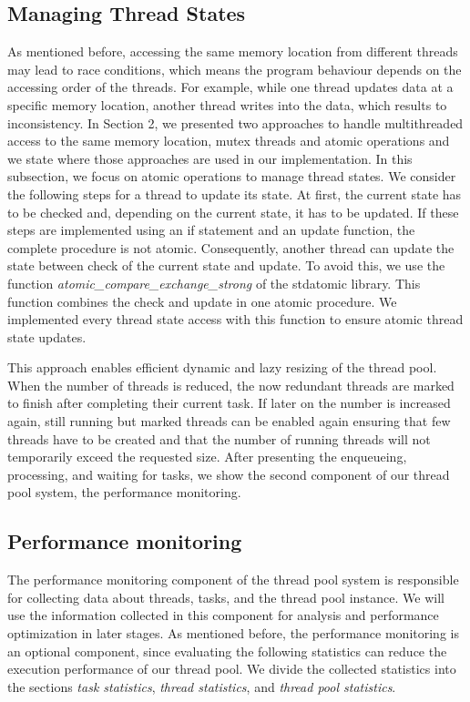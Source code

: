 \documentclass[conference]{IEEEtran}
\begin{document}
\subsection{Managing Thread States}
As mentioned before, accessing the same memory location from different threads may lead to race conditions, which means the program behaviour depends on the accessing order of the threads. For example, while one thread updates data at a specific memory location, another thread writes into the data, which results to inconsistency. In Section 2, we presented two approaches to handle multithreaded access to the same memory location, mutex threads and atomic operations and we state where those approaches are used in our implementation. In this subsection, we focus on atomic operations to manage thread states. We consider the following steps for a thread to update its state. At first, the current state has to be checked and, depending on the current state, it has to be updated. If these steps are implemented using an if statement and an update function, the complete procedure is not atomic. Consequently, another thread can update the state between check of the current state and update. To avoid this, we use the function \emph{atomic\_compare\_exchange\_strong} \cite{atomicstrong} of the stdatomic library. This function combines the check and update in one atomic procedure. We implemented every thread state access with this function to ensure atomic thread state updates. 

This approach enables efficient dynamic and lazy resizing of the thread pool. When the number of threads is reduced, the now redundant threads are marked to finish after completing their current task. If later on the number is increased again, still running but marked threads can be enabled again ensuring that few threads have to be created and that the number of running threads will not temporarily exceed the requested size. 
 After presenting the enqueueing, processing, and waiting for tasks, we show the second component of our thread pool system, the performance monitoring.

\subsection{Performance monitoring}
The performance monitoring component of the thread pool system is responsible for collecting data about threads, tasks, and the thread pool instance. We will use the information collected in this component for analysis and performance optimization in later stages. As mentioned before, the performance monitoring is an optional component, since evaluating the following statistics can reduce the execution performance of our thread pool. We divide the collected statistics into the sections \emph{task statistics}, \emph{thread statistics}, and \emph{thread pool statistics}.
\end{document}
